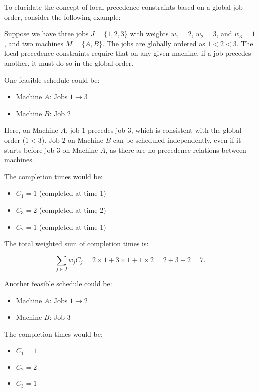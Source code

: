 \begin{example}

    To elucidate the concept of local precedence constraints based on a global job order, consider the following example:

    Suppose we have three jobs $J = \{1, 2, 3\}$ with weights $w_1 = 2$, $w_2 = 3$, and $w_3 = 1$, and two machines $M = \{A, B\}$. The jobs are globally ordered as $1 < 2 < 3$. The local precedence constraints require that on any given machine, if a job precedes another, it must do so in the global order.

    One feasible schedule could be:

    \begin{itemize}
        \item Machine $A$: Jobs $1 \rightarrow 3$
        \item Machine $B$: Job $2$
    \end{itemize}

    Here, on Machine $A$, job $1$ precedes job $3$, which is consistent with the global order ($1 < 3$). Job $2$ on Machine $B$ can be scheduled independently, even if it starts before job $3$ on Machine $A$, as there are no precedence relations between machines.

    The completion times would be:

    \begin{itemize}
        \item $C_1 = 1$ (completed at time 1)
        \item $C_3 = 2$ (completed at time 2)
        \item $C_2 = 1$ (completed at time 1)
    \end{itemize}

    The total weighted sum of completion times is:

    \[
        \sum_{j \in J} w_j C_j = 2 \times 1 + 3 \times 1 + 1 \times 2 = 2 + 3 + 2 = 7.
    \]

    Another feasible schedule could be:

    \begin{itemize}
        \item Machine $A$: Jobs $1 \rightarrow 2$
        \item Machine $B$: Job $3$
    \end{itemize}

    The completion times would be:

    \begin{itemize}
        \item $C_1 = 1$
        \item $C_2 = 2$
        \item $C_3 = 1$
    \end{itemize}


\end{example}
